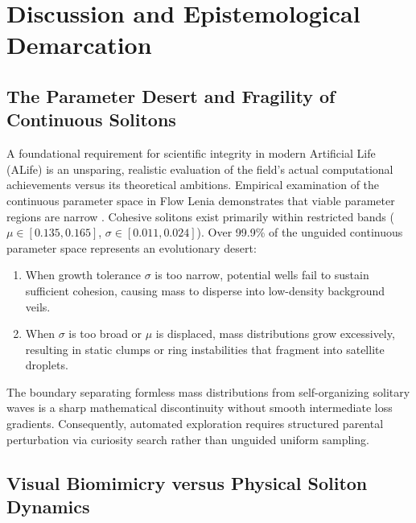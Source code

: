\section{Discussion and Epistemological Demarcation}
\label{sec:discussion}

\subsection{The Parameter Desert and Fragility of Continuous Solitons}
\label{subsec:disc_parameter_desert}

A foundational requirement for scientific integrity in modern Artificial Life (ALife) is an unsparing, realistic evaluation of the field's actual computational achievements versus its theoretical ambitions. Empirical examination of the continuous parameter space in Flow Lenia demonstrates that viable parameter regions are narrow \parencite{chan2023towards, plantec2025flowlenia}. Cohesive solitons exist primarily within restricted bands ($\mu \in [0.135, 0.165]$, $\sigma \in [0.011, 0.024]$). Over 99.9\% of the unguided continuous parameter space represents an evolutionary desert:
\begin{enumerate}
    \item When growth tolerance $\sigma$ is too narrow, potential wells fail to sustain sufficient cohesion, causing mass to disperse into low-density background veils.
    \item When $\sigma$ is too broad or $\mu$ is displaced, mass distributions grow excessively, resulting in static clumps or ring instabilities that fragment into satellite droplets.
\end{enumerate}
The boundary separating formless mass distributions from self-organizing solitary waves is a sharp mathematical discontinuity without smooth intermediate loss gradients. Consequently, automated exploration requires structured parental perturbation via curiosity search \parencite{michel2025exploring, kumar2025asal} rather than unguided uniform sampling.

\subsection{Visual Biomimicry versus Physical Soliton Dynamics}
\label{subsec:disc_aesthetic_fallacy}

